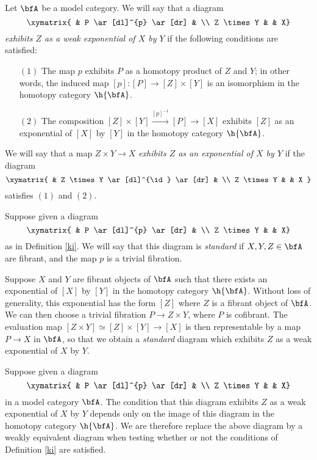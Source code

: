 \begin{definition}\label{ki}
Let $\bfA$ be a model category. We will say that a diagram
$$ \xymatrix{ &  P \ar[dl]^{p} \ar[dr] & \\
Z \times Y & & X}$$
{\it exhibits $Z$ as a weak exponential of $X$ by $Y$} if the following conditions are satisfied:
\begin{itemize}
\item[$(1)$] The map $p$ exhibits $P$ as a homotopy product of $Z$ and $Y$; in other words,
the induced map $[p]: [P] \rightarrow [Z] \times [Y]$ is an isomorphism in the homotopy category
$\h{\bfA}$. 
\item[$(2)$] The composition
$[Z] \times [Y] \stackrel{ [p]^{-1} }{\rightarrow} [P] \rightarrow [X]$
exhibits $[Z]$ as an exponential of $[X]$ by $[Y]$ in the homotopy category $\h{\bfA}$.
\end{itemize}

We will say that a map $Z \times Y \rightarrow X$ {\it exhibits $Z$ as an exponential of
$X$ by $Y$} if the diagram
$$ \xymatrix{ & Z \times Y \ar[dl]^{\id} \ar[dr] & \\
Z \times Y & & X }$$
satisfies $(1)$ and $(2)$.
\end{definition}

\begin{remark}
Suppose given a diagram
$$ \xymatrix{ & P \ar[dl]^{p} \ar[dr] &  \\
Z \times Y & & X}$$
as in Definition \ref{ki}. We will say that this diagram is {\em standard} if
$X, Y, Z \in \bfA$ are fibrant, and the map $p$ is a trivial fibration.

Suppose $X$ and $Y$ are fibrant objects of $\bfA$ such that there exists an exponential
of $[X]$ by $[Y]$ in the homotopy category $\h{\bfA}$. Without loss of generality, this
exponential has the form $[Z]$ where $Z$ is a fibrant object of $\bfA$. We can then
choose a trivial fibration $P \rightarrow Z \times Y$, where $P$ is cofibrant. The evaluation
map $[Z \times Y] \simeq [Z] \times [Y] \rightarrow [X]$ is then representable by
a map $P \rightarrow X$ in $\bfA$, so that we obtain a {\em standard} diagram which exhibits
$Z$ as a weak exponential of $X$ by $Y$.
\end{remark}

\begin{remark}
Suppose given a diagram
$$ \xymatrix{ & P \ar[dl]^{p} \ar[dr] & \\
Z \times Y & & X}$$
in a model category $\bfA$. The condition that this diagram exhibits
$Z$ as a weak exponential of $X$ by $Y$ depends only on the image of this diagram
in the homotopy category $\h{\bfA}$. We are therefore replace the above diagram by a weakly equivalent diagram when testing whether or not the conditions of Definition \ref{ki} are satisfied.
\end{remark}

